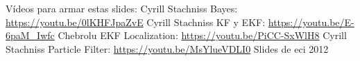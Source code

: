 Vídeos para armar estas slides:
Cyrill Stachniss Bayes: \url{https://youtu.be/0lKHFJpaZvE}
Cyrill Stachniss KF y EKF: \url{https://youtu.be/E-6paM_Iwfc}
Chebrolu EKF Localization: \url{https://youtu.be/PiCC-SxWlH8}
Cyrill Stachniss Particle Filter: \url{https://youtu.be/MsYlueVDLI0}
Slides de eci 2012